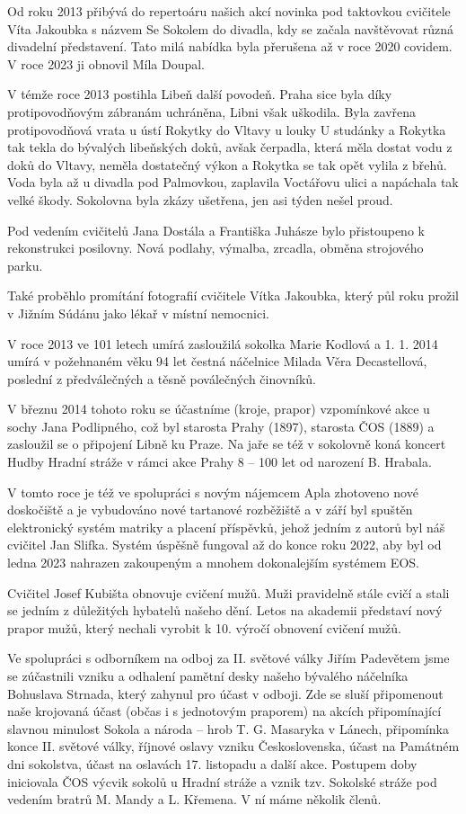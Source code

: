 Od roku 2013 přibývá do repertoáru našich akcí novinka pod taktovkou
cvičitele Víta Jakoubka s názvem Se Sokolem do divadla, kdy se začala
navštěvovat různá divadelní představení. Tato milá nabídka byla
přerušena až v roce 2020 covidem. V roce 2023 ji obnovil Míla Doupal.

V témže roce 2013 postihla Libeň další povodeň. Praha sice byla díky
protipovodňovým zábranám uchráněna, Libni však uškodila. Byla zavřena
protipovodňová vrata u ústí Rokytky do Vltavy u louky U studánky a
Rokytka tak tekla do bývalých libeňských doků, avšak čerpadla, která
měla dostat vodu z doků do Vltavy, neměla dostatečný výkon a Rokytka se
tak opět vylila z břehů. Voda byla až u divadla pod Palmovkou, zaplavila
Voctářovu ulici a napáchala tak velké škody. Sokolovna byla zkázy
ušetřena, jen asi týden nešel proud.

Pod vedením cvičitelů Jana Dostála a Františka Juhásze bylo přistoupeno
k rekonstrukci posilovny. Nová podlahy, výmalba, zrcadla, obměna
strojového parku.

Také proběhlo promítání fotografií cvičitele Vítka Jakoubka, který půl
roku prožil v Jižním Súdánu jako lékař v místní nemocnici.

V roce 2013 ve 101 letech umírá zasloužilá sokolka Marie Kodlová a 1. 1.
2014 umírá v požehnaném věku 94 let čestná náčelnice Milada Věra
Decastellová, poslední z předválečných a těsně poválečných činovníků.

V březnu 2014 tohoto roku se účastníme (kroje, prapor) vzpomínkové akce
u sochy Jana Podlipného, což byl starosta Prahy (1897), starosta ČOS
(1889) a zasloužil se o připojení Libně ku Praze. Na jaře se též v
sokolovně koná koncert Hudby Hradní stráže v rámci akce Prahy 8 -- 100
let od narození B. Hrabala.

V tomto roce je též ve spolupráci s novým nájemcem Apla zhotoveno nové
doskočiště a je vybudováno nové tartanové rozběžiště a v září byl
spuštěn elektronický systém matriky a placení příspěvků, jehož jedním z
autorů byl náš cvičitel Jan Slifka. Systém úspěšně fungoval až do konce
roku 2022, aby byl od ledna 2023 nahrazen zakoupeným a mnohem
dokonalejším systémem EOS.

Cvičitel Josef Kubišta obnovuje cvičení mužů. Muži pravidelně stále
cvičí a stali se jedním z důležitých hybatelů našeho dění. Letos na
akademii představí nový prapor mužů, který nechali vyrobit k 10. výročí
obnovení cvičení mužů.

Ve spolupráci s odborníkem na odboj za II. světové války Jiřím Padevětem
jsme se zúčastnili vzniku a odhalení pamětní desky našeho bývalého
náčelníka Bohuslava Strnada, který zahynul pro účast v odboji. Zde se
sluší připomenout naše krojovaná účast (občas i s jednotovým praporem)
na akcích připomínající slavnou minulost Sokola a národa -- hrob T. G.
Masaryka v Lánech, připomínka konce II. světové války, říjnové oslavy
vzniku Československa, účast na Památném dni sokolstva, účast na
oslavách 17. listopadu a další akce. Postupem doby iniciovala ČOS výcvik
sokolů u Hradní stráže a vznik tzv. Sokolské stráže pod vedením bratrů
M. Mandy a L. Křemena. V ní máme několik členů.

